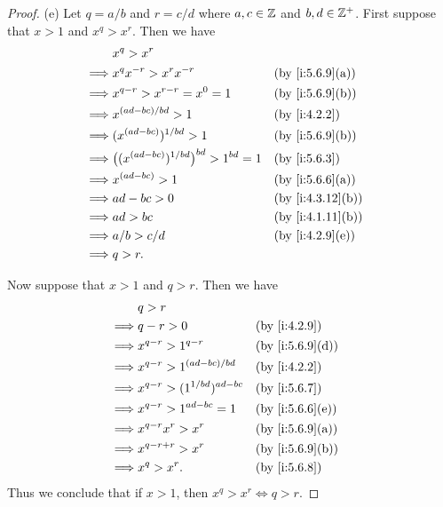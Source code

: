 \begin{proof}{(e)}
  Let \(q = a / b\) and \(r = c / d\) where \(a, c \in \mathbb{Z}\) and \(b, d \in \mathbb{Z}^+\).
  First suppose that \(x > 1\) and \(x^q > x^r\).
  Then we have
  \begin{align*}
             & x^q > x^r                                                                  \\
    \implies & x^q x^{-r} > x^r x^{-r}                              &  & \by{i:5.6.9}[a]  \\
    \implies & x^{q - r} > x^{r - r} = x^0 = 1                      &  & \by{i:5.6.9}[b]  \\
    \implies & x^{(ad - bc) / bd} > 1                               &  & \by{i:4.2.2}     \\
    \implies & (x^{(ad - bc)})^{1 / bd} > 1                         &  & \by{i:5.6.9}[b]  \\
    \implies & \big((x^{(ad - bc)})^{1 / bd}\big)^{bd} > 1^{bd} = 1 &  & \by{i:5.6.3}     \\
    \implies & x^{(ad - bc)} > 1                                    &  & \by{i:5.6.6}[a]  \\
    \implies & ad - bc > 0                                          &  & \by{i:4.3.12}[b] \\
    \implies & ad > bc                                              &  & \by{i:4.1.11}[b] \\
    \implies & a / b > c / d                                        &  & \by{i:4.2.9}[e]  \\
    \implies & q > r.
  \end{align*}

  Now suppose that \(x > 1\) and \(q > r\).
  Then we have
  \begin{align*}
             & q > r                                                   \\
    \implies & q - r > 0                          &  & \by{i:4.2.9}    \\
    \implies & x^{q - r} > 1^{q - r}              &  & \by{i:5.6.9}[d] \\
    \implies & x^{q - r} > 1^{(ad - bc) / bd}     &  & \by{i:4.2.2}    \\
    \implies & x^{q - r} > (1^{1 / bd})^{ad - bc} &  & \by{i:5.6.7}    \\
    \implies & x^{q - r} > 1^{ad - bc} = 1        &  & \by{i:5.6.6}[e] \\
    \implies & x^{q - r} x^r > x^r                &  & \by{i:5.6.9}[a] \\
    \implies & x^{q - r + r} > x^r                &  & \by{i:5.6.9}[b] \\
    \implies & x^q > x^r.                         &  & \by{i:5.6.8}
  \end{align*}
  Thus we conclude that if \(x > 1\), then \(x^q > x^r \iff q > r\).


\end{proof}

